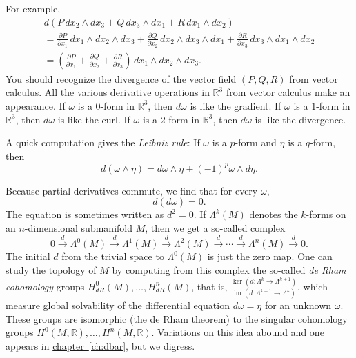\documentclass[12pt,openany]{book}
\newcommand{\R}{{\mathbb{R}}}
\newcommand{\myindex}[1]{#1\index{#1}}
\theoremstyle{plain}
\theoremstyle{remark}
\theoremstyle{definition}
\theoremstyle{exercise}
\theoremstyle{example}
\newcommand{\chapterref}[1]{\hyperref[#1]{chapter~\ref*{#1}}}
\begin{document}
For example,
\begin{multline*}
d \left(
P \, dx_2 \wedge dx_3
+
Q \, dx_3 \wedge dx_1
+
R \, dx_1 \wedge dx_2
\right)
\\
=
\frac{\partial P}{\partial x_1} \, dx_1 \wedge dx_2 \wedge dx_3
+
\frac{\partial Q}{\partial x_2} \, dx_2 \wedge dx_3 \wedge dx_1
+
\frac{\partial R}{\partial x_3} \, dx_3 \wedge dx_1 \wedge dx_2
\\
=
\left(
\frac{\partial P}{\partial x_1}
+
\frac{\partial Q}{\partial x_2}
+
\frac{\partial R}{\partial x_3}
\right) \, dx_1 \wedge dx_2 \wedge dx_3 .
\end{multline*}
You should recognize the divergence of the vector field $(P,Q,R)$ from vector
calculus.
All the various derivative operations in $\R^3$ from vector calculus make an
appearance.
If $\omega$ is a $0$-form in $\R^3$, then $d\omega$ is like the gradient.
If $\omega$ is a $1$-form in $\R^3$, then $d\omega$ is like the curl.
If $\omega$ is a $2$-form in $\R^3$, then $d\omega$ is like the divergence.

A quick computation gives the \emph{\myindex{Leibniz rule}}:
If $\omega$ is a $p$-form and $\eta$ is a $q$-form, then
\begin{equation*}
d(\omega \wedge \eta) = 
d\omega \wedge \eta + {(-1)}^p \omega \wedge d\eta .
\end{equation*}


\medskip

Because partial derivatives commute, we find that for every $\omega$,
\begin{equation*}
d(d\omega) = 0 .
\end{equation*}
The equation is sometimes written as $d^2=0$.
If $\Lambda^k(M)$ denotes the $k$-forms on an $n$-dimensional submanifold $M$,
then we get a so-called complex
\begin{equation*}
0
\overset{d}{\to}
\Lambda^0(M)
\overset{d}{\to}
\Lambda^1(M)
\overset{d}{\to}
\Lambda^2(M)
\overset{d}{\to}
\cdots
\overset{d}{\to}
\Lambda^n(M)
\overset{d}{\to}
0 .
\end{equation*}
The initial $d$ from the trivial space to $\Lambda^0(M)$ is just the zero
map.
One can study the topology of $M$
by computing from this complex the so-called
\emph{\myindex{de Rham cohomology}} groups
$H_{dR}^0(M),\ldots,H_{dR}^n(M)$, that is,
$\frac{\operatorname{ker}(d \colon \Lambda^k
\to \Lambda^{k+1})}{\operatorname{im}(d \colon \Lambda^{k-1} \to \Lambda^k)}$,
which measure global solvability of the differential
equation $d\omega = \eta$ for an unknown $\omega$.  These groups
are isomorphic (the de Rham theorem) to the singular cohomology groups 
$H^0(M,\R),\ldots,H^n(M,\R)$.  Variations
on this idea abound and one appears in \chapterref{ch:dbar}, but we digress.
\end{document}
